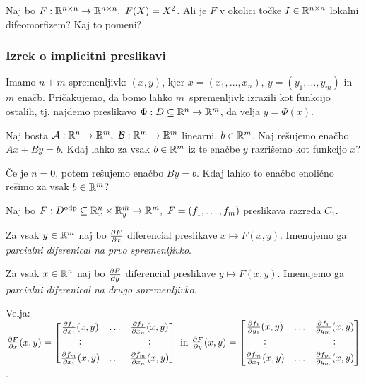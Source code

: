 \begin{zgled}
    Naj bo $F: \mathbb{R}^{n \times n} \to \mathbb{R}^{n \times n}, \ F(X) = X^2$. Ali je $F$ v okolici točke $I \in \mathbb{R}^{n \times n}$ lokalni difeomorfizem? Kaj to pomeni?
\end{zgled}

\newpage
\subsubsection{Izrek o implicitni preslikavi}
Imamo $n+m$ spremenljivk: $(x, y)$, kjer $x = (x_1, \ldots, x_n), \ y = (y_1, \ldots, y_m)$ in $m$ enačb. Pričakujemo, da bomo lahko $m$~spremenljivk izrazili kot funkcijo ostalih, tj. najdemo preslikavo $\Phi: D \subseteq \mathbb{R}^n \to \mathbb{R}^m$, da velja $y = \Phi(x)$.


\begin{primer}
    Naj bosta $\lin{A}: \R^n \to \R^m, \ \lin{B}: \R^m \to \R^m$ linearni, $b \in \mathbb{R}^m$. Naj rešujemo enačbo $Ax + By = b$. Kdaj lahko za vsak $b \in \mathbb{R}^m$ iz te  enačbe $y$ razrišemo kot funkcijo $x$? 

    Če je $n=0$, potem rešujemo enačbo $By = b$. Kdaj lahko to enačbo enolično rešimo za vsak $b \in \mathbb{R}^m$?
\end{primer}

Naj bo $F: D^\text{odp} \subseteq \mathbb{R}^n_x \times \mathbb{R}^m_y \to \mathbb{R}^m, \ F = (f_1, \ldots, f_m)$ preslikava razreda $C_1$. 

Za vsak $y \in \mathbb{R}^m$ naj bo $\frac{\partial F}{\partial x}$ diferencial preslikave $x \mapsto F(x,y)$. Imenujemo ga \emph{parcialni diferenical na prvo spremenljivko}. 

Za vsak $x \in \mathbb{R}^n$ naj bo $\frac{\partial F}{\partial y}$ diferencial preslikave $y \mapsto F(x,y)$. Imenujemo ga \emph{parcialni diferenical na drugo spremenljivko}. 

Velja: 
$\frac{\partial F}{\partial x}(x,y) = \begin{bmatrix}
    \frac{\partial f_1}{\partial x_1}(x,y) & \ldots & \frac{\partial f_1}{\partial x_n}(x,y) \\
    \vdots & & \vdots \\
    \frac{\partial f_m}{\partial x_1}(x,y) & \ldots & \frac{\partial f_m}{\partial x_n}(x,y) 
\end{bmatrix} \text{ in } \frac{\partial F}{\partial y}(x,y) = \begin{bmatrix}
    \frac{\partial f_1}{\partial y_1}(x,y) & \ldots & \frac{\partial f_1}{\partial y_m}(x,y) \\
    \vdots & & \vdots \\
    \frac{\partial f_m}{\partial x_1}(x,y) & \ldots & \frac{\partial f_m}{\partial y_m}(x,y) 
\end{bmatrix}$.

